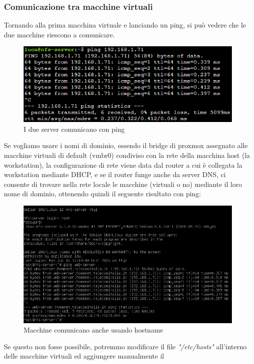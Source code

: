 \documentclass[a4paper]{article}
\begin{document}
\subsubsection{Comunicazione tra macchine virtuali}
Tornando alla prima macchina virtuale e lanciando un ping, si può vedere che le due macchine riescono a 
comunicare.
\begin{figure}[H]
    \centering
    \includegraphics[scale=0.8]{images/MacchineComunicano.png}
    \caption{I due server comunicano con ping}
\end{figure}
Se vogliamo usare i nomi di dominio, essendo il bridge di proxmox assegnato alle macchine virtuali di default (vmbr0)
condiviso con la rete della macchina host (la workstation), la configurazione di rete viene data dal router a cui è collegata
la workstation mediante DHCP, e se il router funge anche da server DNS, ci consente di trovare nella rete locale le macchine (virtuali o no)
mediante il loro nome di dominio, ottenendo quindi il seguente risultato con ping:
\begin{figure}[H]
    \centering
    \includegraphics[scale=0.55]{images/MacchineComunicanoHostname.png}
    \caption{Macchine comunicano anche usando hostname}
\end{figure}
Se questo non fosse possibile, potremmo modificare il file \textit{"/etc/hosts"} all'interno delle macchine virtuali ed aggiungere manualmente il
\end{document}

